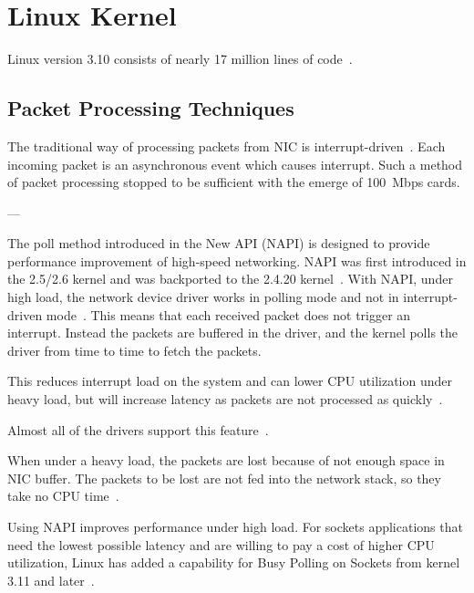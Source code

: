 
\chapter{Linux Kernel}
Linux version 3.10 consists of nearly 17 million lines of code~\cite{linux-by-numbers}.



\section{Packet Processing Techniques}
The traditional way of processing packets from NIC is interrupt-driven~\cite{linux-kernel-networking}.
Each incoming packet is an asynchronous event which causes interrupt.
Such a method of packet processing stopped to be sufficient with the emerge of 100~Mbps cards. %

---

The poll method introduced in the New API (NAPI) is designed
to provide performance improvement of high-speed networking.
NAPI was first introduced in the 2.5/2.6 kernel and was backported to the 2.4.20 kernel~\cite{linux-kernel-networking}.
With NAPI, under high load, the network
device driver works in polling mode and not in interrupt-driven mode~\cite{linux-kernel-networking}.
This means that each received packet does not trigger an interrupt.
Instead the packets are buffered in the driver, and the kernel polls the driver from time to time to
fetch the packets.

This reduces interrupt load on the system and can lower CPU utilization under heavy load,
but will increase latency as packets are not processed as quickly~\cite{linux-foundation-napi}.

Almost all of the drivers support this feature~\cite{linux-kernel-networking}.

When under a heavy load, the packets are lost because of not enough space in NIC buffer.
The packets to be lost are not fed into the network stack, so they take no CPU time~\cite{haifux-lecture}.

Using NAPI improves performance under high load. For sockets applications that need the lowest
possible latency and are willing to pay a cost of higher CPU utilization, Linux has added a capability for Busy Polling on
Sockets from kernel 3.11 and later~\cite{linux-kernel-networking}.



